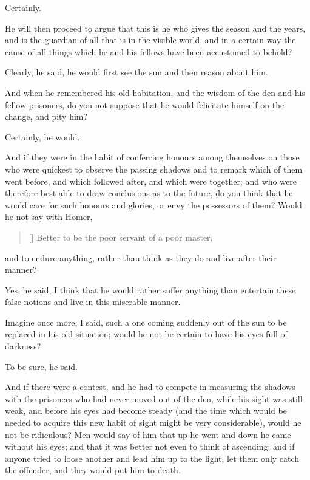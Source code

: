 Certainly.

He will then proceed to argue that this is he who gives the season and
the years, and is the guardian of all that is in the visible world,
and in a certain way the cause of all things which he and his fellows
have been accustomed to behold?

Clearly, he said, he would first see the sun and then reason about
him.

And when he remembered his old habitation, and the wisdom of the den
and his fellow-prisoners, do you not suppose that he would felicitate
himself on the change, and pity him?

Certainly, he would.

And if they were in the habit of conferring honours among themselves
on those who were quickest to observe the passing shadows and to
remark which of them went before, and which followed after, and which
were together; and who were therefore best able to draw conclusions as
to the future, do you think that he would care for such honours and
glories, or envy the possessors of them? Would he not say with Homer,

\settowidth{}
\begin{verse}[\versewidth]
Better to be the poor servant of a poor master,
\end{verse}

\noindent and to endure anything, rather than think as they do and
live after their manner?

Yes, he said, I think that he would rather suffer anything than
entertain these false notions and live in this miserable manner.

Imagine once more, I said, such a one coming suddenly out of the sun
to be replaced in his old situation; would he not be certain to have
his eyes full of darkness?

To be sure, he said.

And if there were a contest, and he had to compete in measuring the
shadows with the prisoners who had never moved out of the den, while
his sight was still weak, and before his eyes had become steady (and
the time which would be needed to acquire this new habit of sight
might be very considerable), would he not be ridiculous? Men would say
of him that up he went and down he came without his eyes; and that it
was better not even to think of ascending; and if anyone tried to
loose another and lead him up to the light, let them only catch the
offender, and they would put him to death.

